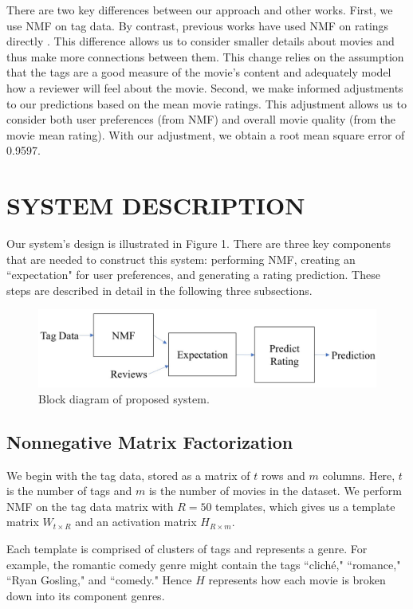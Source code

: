 \documentclass[letterpaper, 10 pt, conference]{ieeeconf}  %
\begin{document}
There are two key differences between our approach and other works. First, we use NMF on tag data. By contrast, previous works have used NMF on ratings directly \cite{nmfratings}. This difference allows us to consider smaller details about movies and thus make more connections between them. This change relies on the assumption that the tags are a good measure of the movie's content and adequately model how a reviewer will feel about the movie. Second, we make informed adjustments to our predictions based on the mean movie ratings. This adjustment allows us to consider both user preferences (from NMF) and overall movie quality (from the movie mean rating). With our adjustment, we obtain a root mean square error of 0.9597.

\medbreak
\section{SYSTEM DESCRIPTION}

Our system's design is illustrated in Figure 1. There are three key components that are needed to construct this system: performing NMF, creating an ``expectation" for user preferences, and generating a rating prediction. These steps are described in detail in the following three subsections.

\begin{figure}[h]
   \includegraphics[scale=0.5]{./figs/blockdiagram.jpg}
   \caption{Block diagram of proposed system.}
\end{figure}

\smallbreak
\subsection{Nonnegative Matrix Factorization}

We begin with the tag data, stored as a matrix of $t$ rows and $m$ columns. Here, $t$ is the number of tags and $m$ is the number of movies in the dataset.
We perform NMF on the tag data matrix with $R=50$ templates, which gives us a template matrix $W_{t \times R}$ and an activation matrix $H_{R \times m}$. 

Each template is comprised of clusters of tags and represents a genre. For example, the romantic comedy genre might contain the tags ``cliché," ``romance," ``Ryan Gosling," and ``comedy." Hence $H$ represents how each movie is broken down into its component genres.
\end{document}
